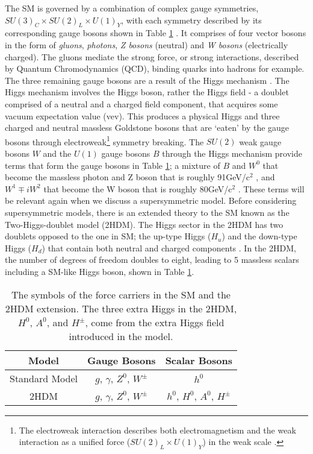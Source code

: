 The SM is governed by a combination of complex gauge symmetries, $SU(3)_C\times SU(2)_L \times U(1)_Y$, with each symmetry described by its corresponding gauge bosons shown in Table \ref{tab:SMBos} \cite{thomson2013modern}. It comprises of four vector bosons in the form of \textit{gluons}, \textit{photons}, \textit{Z bosons} (neutral) and \textit{W bosons} (electrically charged). The gluons mediate the strong force, or strong interactions, described by Quantum Chromodynamics (QCD), binding quarks into hadrons for example. The three remaining gauge bosons are a result of the Higgs mechanism \cite{higgs1964broken, englert1964broken}. The Higgs mechanism involves the Higgs boson, rather the Higgs field - a doublet comprised of a neutral and a charged field component, that acquires some vacuum expectation value (vev). This produces a physical Higgs and three charged and neutral massless Goldstone bosons that are `eaten' by the gauge bosons through electroweak\footnote{The electroweak interaction describes both electromagnetism and the weak interaction as a unified force  ($SU(2)_L \times U(1)_Y$) in the weak scale \cite{thomson2013modern}.} symmetry breaking. The $SU(2)$ weak gauge bosons $W$ and the $U(1)$ gauge bosons $B$ through the Higgs mechanism provide terms that form the gauge bosons in Table \ref{tab:SMBos}; a mixture of $B$ and $W^0$ that become the massless photon and Z boson that is roughly 91GeV/c$^2$ \cite{tanabashi2018review}, and $W^1 \mp iW^2$ that become the W boson that is roughly 80GeV/c$^2$ \cite{tanabashi2018review}. These terms will be relevant again when we discuss a supersymmetric model. Before considering supersymmetric models, there is an extended theory to the SM known as the Two-Higgs-doublet model (2HDM).  The Higgs sector in the 2HDM has two doublets opposed to the one in SM; the up-type Higgs ($H_u$) and the down-type Higgs ($H_d$) that contain both neutral and charged components \cite{2HDM}. In the 2HDM, the number of degrees of freedom doubles to eight, leading to 5 massless scalars including a SM-like Higgs boson, shown in Table \ref{tab:SMBos}.  \\

\begin{table}[htbp]
    \centering
    {\renewcommand{\arraystretch}{1.2}
    \begin{tabular}{c||c|c}
    \toprule
    Model & Gauge Bosons  & Scalar Bosons \\
    \midrule
    Standard Model & $g$, $\gamma$, $Z^0$, $W^\pm$ & $h^0$ \\
    \hline
    2HDM & $g$, $\gamma$, $Z^0$, $W^\pm$ & $h^0$, $H^0$, $A^0$, $H^\pm$ \\
    \bottomrule
    \end{tabular}}
    \caption{The symbols of the force carriers in the SM and the 2HDM extension. The three extra Higgs in the 2HDM, $H^0$, $A^0$, and $H^\pm$, come from the extra Higgs field introduced in the model.}
    \label{tab:SMBos}
\end{table}



